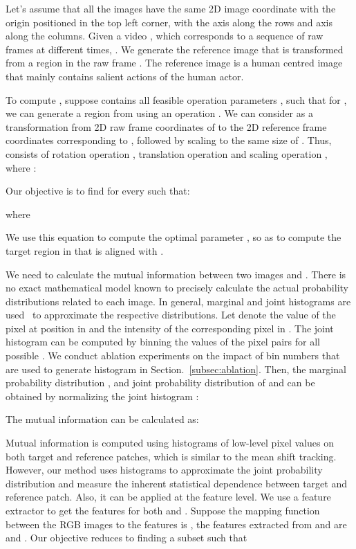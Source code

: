 \documentclass[10pt,twocolumn,letterpaper]{article}
\begin{document}
{Let's assume that all the images have the same 2D image coordinate with the origin positioned in the top left corner, with the  axis along the rows and  axis along the columns. Given a video , which corresponds to a sequence of raw frames at different times, . We generate the reference image  that is transformed from a region in the raw frame . The reference image  is a human centred image that mainly contains salient actions of the human actor.


 To compute , suppose  contains all feasible operation parameters , such that for , we can generate a region from  using an operation . We can consider  as a transformation from 2D raw frame coordinates of  to the 2D reference frame coordinates corresponding to , followed by scaling to the same size of . Thus,  consists of rotation operation , translation operation  and scaling operation , where : 




\noindent Our objective is to find  for every  such that:

where

We use this equation to compute the optimal parameter , so as to compute the target region in  that is aligned with .

 We need to calculate the mutual information between two images  and . There is no exact mathematical model known to precisely calculate the actual probability distributions related to each image. In general, marginal and joint histograms are  used~\cite{Viola1995AlignmentBM} to approximate the respective distributions. Let  denote the value of the pixel at position  in  and  the intensity of the corresponding pixel in . The joint histogram  can be computed by binning the values of the pixel pairs  for all possible . We conduct ablation experiments on the impact of bin numbers that are used to generate histogram in Section.~\ref{subsec:ablation}. Then, the marginal probability distribution , and joint probability distribution  of  and  can be obtained by normalizing the joint histogram :

The mutual information can be calculated as:

Mutual information is computed using histograms of low-level pixel values on both target and reference patches, which is similar to the mean shift tracking. However, our method uses histograms to approximate the joint probability distribution and measure the inherent statistical dependence between target and reference patch. Also, it can be applied at the feature level. We use a feature extractor to get the features for both  and . Suppose the mapping function between the RGB images to the features is , the features extracted from  and  are  and . Our objective reduces to finding a subset  such that

}
\end{document}
